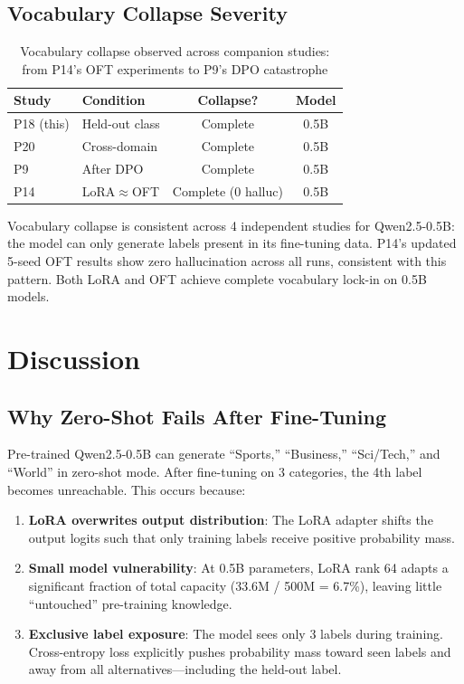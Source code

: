 \documentclass[journal]{IEEEtran}
\begin{document}
\subsection{Vocabulary Collapse Severity}

\begin{table}[!ht]
\centering\caption{Vocabulary collapse observed across companion studies: from P14's OFT experiments to P9's DPO catastrophe}
\label{tab:collapse}
\begin{tabular}{llcc}
\toprule
\textbf{Study} & \textbf{Condition} & \textbf{Collapse?} & \textbf{Model} \\
\midrule
P18 (this) & Held-out class & Complete & 0.5B \\
P20~\cite{p20} & Cross-domain & Complete & 0.5B \\
P9~\cite{p9} & After DPO & Complete & 0.5B \\
P14~\cite{p14} & LoRA$\approx$OFT & Complete (0 halluc) & 0.5B \\
\bottomrule
\end{tabular}
\end{table}

Vocabulary collapse is consistent across 4 independent studies for Qwen2.5-0.5B: the model can only generate labels present in its fine-tuning data. P14's updated 5-seed OFT results show zero hallucination across all runs, consistent with this pattern. Both LoRA and OFT achieve complete vocabulary lock-in on 0.5B models.

\section{Discussion}

\subsection{Why Zero-Shot Fails After Fine-Tuning}
Pre-trained Qwen2.5-0.5B can generate ``Sports,'' ``Business,'' ``Sci/Tech,'' and ``World'' in zero-shot mode. After fine-tuning on 3 categories, the 4th label becomes unreachable. This occurs because:

\begin{enumerate}
\item \textbf{LoRA overwrites output distribution}: The LoRA adapter shifts the output logits such that only training labels receive positive probability mass.
\item \textbf{Small model vulnerability}: At 0.5B parameters, LoRA rank 64 adapts a significant fraction of total capacity (33.6M / 500M = 6.7\%), leaving little ``untouched'' pre-training knowledge.
\item \textbf{Exclusive label exposure}: The model sees only 3 labels during training. Cross-entropy loss explicitly pushes probability mass toward seen labels and away from all alternatives---including the held-out label.
\end{enumerate}
\end{document}
